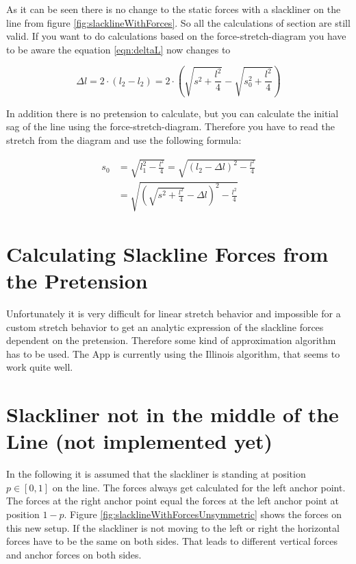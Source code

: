 As it can be seen there is no change to the static forces with a slackliner on the line from figure \ref{fig:slacklineWithForces}. So all the calculations of section  are still valid. If you want to do calculations based on the force-stretch-diagram you have to be aware the equation \ref{eqn:deltaL} now changes to

\begin{equation}
	\Delta l = 2\cdot (l_2 - l_2) = 2\cdot \left( \sqrt{s^2+\frac{l^2}{4}} - \sqrt{s_0^2+\frac{l^2}{4}}\right)
	\label{eqn:deltaLRodeo}
\end{equation}

In addition there is no pretension to calculate, but you can calculate the initial sag of the line using the force-stretch-diagram. Therefore you have to read the stretch from the diagram and use the following formula:

\begin{align}
	s_0 &= \sqrt{l_1^2 - \frac{l^2}{4}} = \sqrt{\left(l_2-\Delta l\right)^2 - \frac{l^2}{4}} \\
	&= \sqrt{\left( \sqrt{s^2 + \frac{l^2}{4}}  -\Delta l\right)^2 - \frac{l^2}{4}}
\end{align}

\section{Calculating Slackline Forces from the Pretension}

Unfortunately it is very difficult for linear stretch behavior and impossible for a custom stretch behavior to get an analytic expression of the slackline forces dependent on the pretension. Therefore some kind of approximation algorithm has to be used. The App is currently using the Illinois algorithm, that seems to work quite well.

\section{Slackliner not in the middle of the Line (not implemented yet)}

In the following it is assumed that the slackliner is standing at position $p \in [0,1]$ on the line. The forces always get calculated for the left anchor point. The forces at the right anchor point equal the forces at the left anchor point at position $1-p$. Figure \ref{fig:slacklineWithForcesUnsymmetric} shows the forces on this new setup. If the slackliner is not moving to the left or right the horizontal forces have to be the same on both sides. That leads to different vertical forces and anchor forces on both sides.

